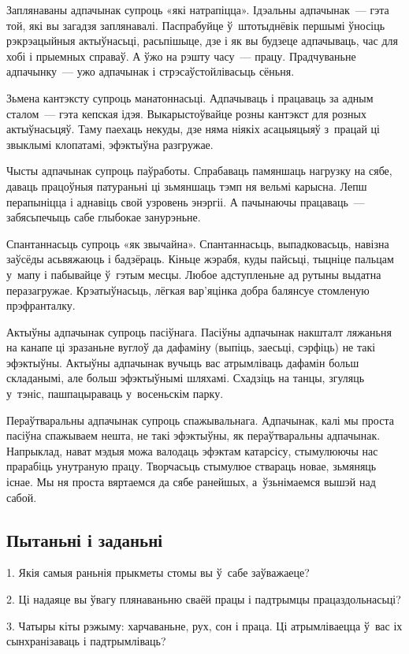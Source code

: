 Заплянаваны адпачынак супроць «які натрапіцца». Ідэальны адпачынак~--- гэта той, які вы загадзя заплянавалі. Паспрабуйце ў~штотыднёвік першымі ўносіць рэкрэацыйныя актыўнасьці, расьпішыце, дзе і як вы будзеце адпачываць, час для хобі і прыемных справаў. А ўжо на рэшту часу~--- працу. Прадчуваньне адпачынку~--- ужо адпачынак і стрэсаўстойлівасьць сёньня.

Зьмена кантэксту супроць манатоннасьці. Адпачываць і працаваць за адным сталом~--- гэта кепская ідэя. Выкарыстоўвайце розны кантэкст для розных актыўнасьцяў. Таму паехаць некуды, дзе няма ніякіх асацыяцыяў з~працай ці звыклымі клопатамі, эфэктыўна разгружае.

Чысты адпачынак супроць паўработы. Спрабаваць памяншаць нагрузку на сябе, даваць працоўныя патураньні ці зьмяншаць тэмп ня вельмі карысна. Лепш перапыніцца і аднавіць свой узровень энэргіі. А пачынаючы працаваць~--- забясьпечыць сабе глыбокае занурэньне.

Спантаннасьць супроць «як звычайна». Спантаннасьць, выпадковасьць, навізна заўсёды асьвяжаюць і бадзёраць. Кіньце жэрабя, куды пайсьці, тыцніце пальцам у~мапу і пабывайце ў~гэтым месцы. Любое адступленьне ад рутыны выдатна перазагружае. Крэатыўнасьць, лёгкая вар'яцінка добра балянсуе стомленую прэфранталку.

Актыўны адпачынак супроць пасіўнага. Пасіўны адпачынак накшталт ляжаньня на канапе ці зразаньне вуглоў да дафаміну (выпіць, заесьці, сэрфіць) не такі эфэктыўны. Актыўны адпачынак вучыць вас атрымліваць дафамін больш складанымі, але больш эфэктыўнымі шляхамі. Схадзіць на танцы, згуляць у~тэніс, пашпацыраваць у~восеньскім парку.

Пераўтваральны адпачынак супроць спажывальнага. Адпачынак, калі мы проста пасіўна спажываем нешта, не такі эфэктыўны, як пераўтваральны адпачынак. Напрыклад, нават мэдыя можа валодаць эфэктам катарсісу, стымулюючы нас прарабіць унутраную працу. Творчасьць стымулюе ствараць новае, зьмяняць існае. Мы ня проста вяртаемся да сябе ранейшых, а~ўзьнімаемся вышэй над сабой.

\subsection*{Пытаньні і заданьні}

1. Якія самыя раньнія прыкметы стомы вы ў~сабе заўважаеце?

2. Ці надаяце вы ўвагу плянаваньню сваёй працы і падтрымцы працаздольнасьці?

3. Чатыры кіты рэжыму: харчаваньне, рух, сон і праца. Ці атрымліваецца ў~вас іх сынхранізаваць і падтрымліваць?


